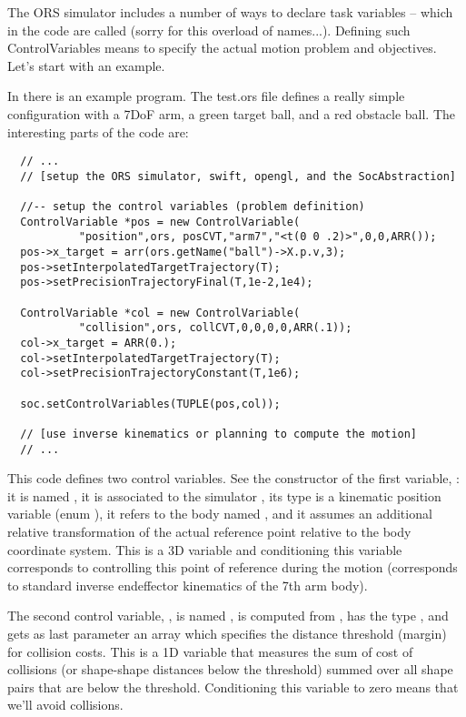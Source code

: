 The ORS simulator includes a number of ways to declare task variables
-- which in the code are called  (sorry for this
overload of names...). Defining such ControlVariables means to specify
the actual motion problem and objectives. Let's start with an example.

In  there is an example program. The test.ors file
defines a really simple configuration with a 7DoF arm, a green target
ball, and a red obstacle ball. The interesting parts of the code are:
\begin{lstlisting}
  // ...
  // [setup the ORS simulator, swift, opengl, and the SocAbstraction]

  //-- setup the control variables (problem definition)
  ControlVariable *pos = new ControlVariable(
           "position",ors, posCVT,"arm7","<t(0 0 .2)>",0,0,ARR());
  pos->x_target = arr(ors.getName("ball")->X.p.v,3);
  pos->setInterpolatedTargetTrajectory(T);
  pos->setPrecisionTrajectoryFinal(T,1e-2,1e4);
  
  ControlVariable *col = new ControlVariable(
           "collision",ors, collCVT,0,0,0,0,ARR(.1));
  col->x_target = ARR(0.);
  col->setInterpolatedTargetTrajectory(T);
  col->setPrecisionTrajectoryConstant(T,1e6);
  
  soc.setControlVariables(TUPLE(pos,col));

  // [use inverse kinematics or planning to compute the motion]
  // ...
\end{lstlisting}
This code defines two control variables. See the constructor of the
first variable, : it is named , it is
associated to the simulator , its type is a kinematic
position variable (enum ), it refers to the body
named , and it assumes an additional relative transformation
 of the actual reference point relative to the body
coordinate system. This is a 3D variable and conditioning this
variable corresponds to controlling this point of reference during the
motion (corresponds to standard inverse endeffector kinematics of the
7th arm body).

The second control variable, , is named , is
computed from , has the type , and gets as last
parameter an array \cmd{[0.1]} which specifies the distance threshold
(margin) for collision costs. This is a 1D variable that measures the
sum of cost of collisions (or shape-shape distances below the
threshold) summed over all shape pairs that are below the
threshold. Conditioning this variable to zero means that we'll avoid
collisions.

